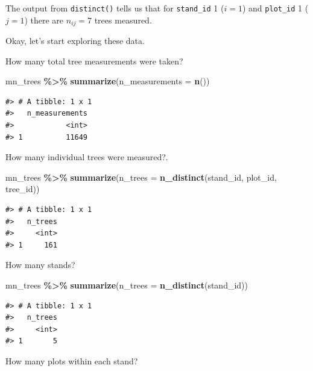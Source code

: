 \documentclass[
  11pt,
]{krantz}
\newenvironment{Shaded}{\begin{snugshade}}{\end{snugshade}}
\newcommand{\DataTypeTok}[1]{\textcolor[rgb]{0.13,0.29,0.53}{#1}}
\newcommand{\KeywordTok}[1]{\textcolor[rgb]{0.13,0.29,0.53}{\textbf{#1}}}
\newcommand{\NormalTok}[1]{#1}
\newcommand{\OperatorTok}[1]{\textcolor[rgb]{0.81,0.36,0.00}{\textbf{#1}}}
\newcommand{\StringTok}[1]{\textcolor[rgb]{0.31,0.60,0.02}{#1}}
\theoremstyle{definition}
\theoremstyle{definition}
\theoremstyle{definition}
\theoremstyle{definition}
\theoremstyle{remark}
\begin{document}
The output from \texttt{distinct()} tells us that for \texttt{stand\_id} 1 (\(i = 1\)) and \texttt{plot\_id} 1 (\(j = 1\)) there are \(n_{ij} = 7\) trees measured.

Okay, let's start exploring these data.

How many total tree measurements were taken?

\begin{Shaded}
\begin{Highlighting}[]
\NormalTok{mn\_trees }\OperatorTok{\%\textgreater{}\%}\StringTok{ }\KeywordTok{summarize}\NormalTok{(}\DataTypeTok{n\_measurements =} \KeywordTok{n}\NormalTok{())}
\end{Highlighting}
\end{Shaded}

\begin{verbatim}
#> # A tibble: 1 x 1
#>   n_measurements
#>            <int>
#> 1          11649
\end{verbatim}

How many individual trees were measured?.

\begin{Shaded}
\begin{Highlighting}[]
\NormalTok{mn\_trees }\OperatorTok{\%\textgreater{}\%}\StringTok{ }
\StringTok{  }\KeywordTok{summarize}\NormalTok{(}\DataTypeTok{n\_trees =} \KeywordTok{n\_distinct}\NormalTok{(stand\_id, plot\_id, tree\_id))}
\end{Highlighting}
\end{Shaded}

\begin{verbatim}
#> # A tibble: 1 x 1
#>   n_trees
#>     <int>
#> 1     161
\end{verbatim}

How many stands?

\begin{Shaded}
\begin{Highlighting}[]
\NormalTok{mn\_trees }\OperatorTok{\%\textgreater{}\%}\StringTok{ }\KeywordTok{summarize}\NormalTok{(}\DataTypeTok{n\_trees =} \KeywordTok{n\_distinct}\NormalTok{(stand\_id))}
\end{Highlighting}
\end{Shaded}

\begin{verbatim}
#> # A tibble: 1 x 1
#>   n_trees
#>     <int>
#> 1       5
\end{verbatim}

How many plots within each stand?
\end{document}
